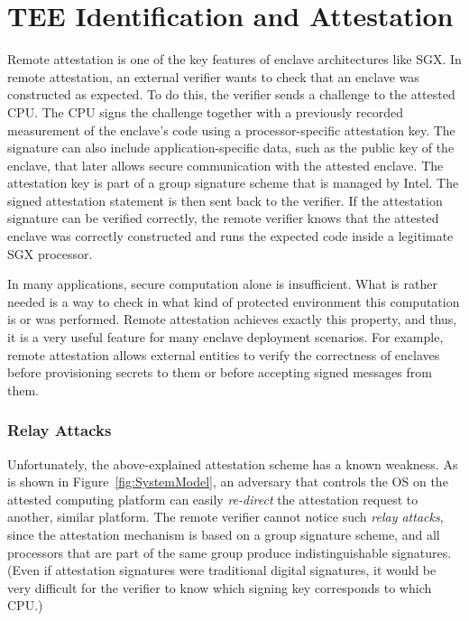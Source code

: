 
\section*{TEE Identification and Attestation}

Remote attestation is one of the key features of enclave architectures like SGX. In remote attestation, an external verifier wants to check that an enclave was constructed as expected. To do this, the verifier sends a challenge to the attested CPU. The CPU signs the challenge together with a previously recorded measurement of the enclave's code using a processor-specific attestation key. The signature can also include application-specific data, such as the public key of the enclave, that later allows secure communication with the attested enclave. The attestation key is part of a group signature scheme that is managed by Intel. The signed attestation statement is then sent back to the verifier. If the attestation signature can be verified correctly, the remote verifier knows that the attested enclave was correctly constructed and runs the expected code inside a legitimate SGX processor. 

In many applications, secure computation alone is insufficient. What is rather needed is a way to check in what kind of protected environment this computation is or was performed. Remote attestation achieves exactly this property, and thus, it is a very useful feature for many enclave deployment scenarios. For example, remote attestation allows external entities to verify the correctness of enclaves before provisioning secrets to them or before accepting signed messages from them.  

\subsubsection*{Relay Attacks}

Unfortunately, the above-explained attestation scheme has a known weakness. As is shown in Figure~\ref{fig:SystemModel}, an adversary that controls the OS on the attested computing platform can easily \emph{re-direct} the attestation request to another, similar platform. The remote verifier cannot notice such \emph{relay attacks}, since the attestation mechanism is based on a group signature scheme, and all processors that are part of the same group produce indistinguishable signatures. (Even if attestation signatures were traditional digital signatures, it would be very difficult for the verifier to know which signing key corresponds to which CPU.) 

